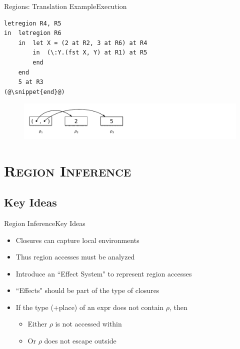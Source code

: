 \documentclass[xcolor=x11names,compress]{beamer}
\newcommand{\snippet}[1] {\textcolor{code}{\texttt{#1}}}
\renewcommand{\(}{\begin{columns}}
\renewcommand{\)}{\end{columns}}
\newcommand{\<}[1]{\begin{column}{#1}}
\renewcommand{\>}{\end{column}}
\begin{document}
\begin{frame}[fragile]{Regions: Translation Example}{Execution}
\begin{lstlisting}
letregion R4, R5
in  letregion R6
    in  let X = (2 at R2, 3 at R6) at R4
        in  (\:Y.(fst X, Y) at R1) at R5
        end
    end
    5 at R3
(@\snippet{end}@)
\end{lstlisting}

\begin{figure}[h]
    \includegraphics[width=\textwidth]{regions-8}
\end{figure}
\end{frame}

\section{\scshape Region Inference}
\subsection{Key Ideas}
\begin{frame}{Region Inference}{Key Ideas}
    \begin{itemize}
        \item Closures can capture local environments
        \pause
        \item Thus region accesses must be analyzed
        \pause
        \item Introduce an ``Effect System" to represent region accesses
        \pause
        \item ``Effects" should be part of the type of closures
        \pause
        \item If the type (+place) of an expr does not contain $\rho$, then
        \pause
        \begin{itemize}
            \item Either $\rho$ is not accessed within
            \pause
            \item Or $\rho$ does not escape outside
        \end{itemize}
    \end{itemize}
\end{frame}
\end{document}
